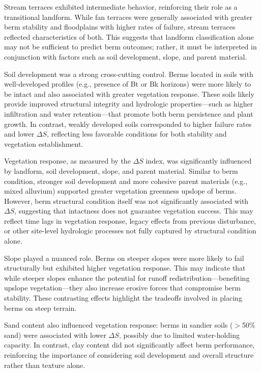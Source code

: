 \documentclass[review]{elsarticle}
\begin{document}
Stream terraces exhibited intermediate behavior, reinforcing their role as a transitional landform. While fan terraces were generally associated with greater berm stability and floodplains with higher rates of failure, stream terraces reflected characteristics of both. This suggests that landform classification alone may not be sufficient to predict berm outcomes; rather, it must be interpreted in conjunction with factors such as soil development, slope, and parent material.

Soil development was a strong cross-cutting control. Berms located in soils with well-developed profiles (e.g., presence of Bt or Bk horizons) were more likely to be intact and also associated with greater vegetation response. These soils likely provide improved structural integrity and hydrologic properties—such as higher infiltration and water retention—that promote both berm persistence and plant growth. In contrast, weakly developed soils corresponded to higher failure rates and lower $\Delta S$, reflecting less favorable conditions for both stability and vegetation establishment.

Vegetation response, as measured by the $\Delta S$ index, was significantly influenced by landform, soil development, slope, and parent material. Similar to berm condition, stronger soil development and more cohesive parent materials (e.g., mixed alluvium) supported greater vegetation greenness upslope of berms. However, berm structural condition itself was not significantly associated with $\Delta S$, suggesting that intactness does not guarantee vegetation success. This may reflect time lags in vegetation response, legacy effects from previous disturbance, or other site-level hydrologic processes not fully captured by structural condition alone.

Slope played a nuanced role. Berms on steeper slopes were more likely to fail structurally but exhibited higher vegetation response. This may indicate that while steeper slopes enhance the potential for runoff redistribution—benefiting upslope vegetation—they also increase erosive forces that compromise berm stability. These contrasting effects highlight the tradeoffs involved in placing berms on steep terrain.

Sand content also influenced vegetation response: berms in sandier soils ($>$50\% sand) were associated with lower $\Delta S$, possibly due to limited water-holding capacity. In contrast, clay content did not significantly affect berm performance, reinforcing the importance of considering soil development and overall structure rather than texture alone.
\end{document}
